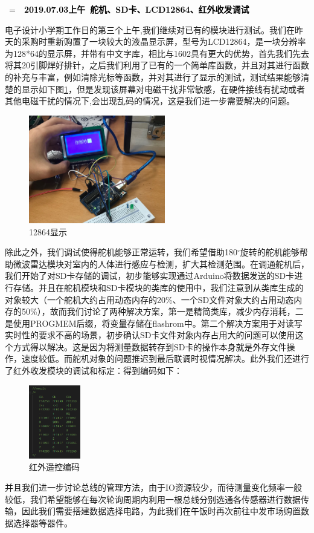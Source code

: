\documentclass[a4paper, 11pt]{article} %
\makeatletter
\newlength\sidebar
\newlength\envborder
\def\esefcolorbox#1#{\esecolor@fbox{#1}}
\def\esecolor@fbox#1#2#3{%
   \color@b@x{\fboxsep\z@\color#1{#2}\fboxs}{\color#1{#3}}}
\newenvironment{eseframed}{%
   \def\FrameCommand{\fboxrule=\the\sidebar  \fboxsep=\the\envborder%
   \esefcolorbox{exampleborder}{examplebg}}%
   \MakeFramed{\FrameRestore}}%
  {\endMakeFramed}
\newcounter{diary}
\newenvironment{diary}[2]
 {\par\medskip\refstepcounter{diary}%
 \hbox{%
 \fboxsep=\the\sidebar\hspace{-\envborder}\hspace{-0.5\sidebar}%
 \colorbox{exampleborder}{%
 \hspace{\envborder}\footnotesize\sffamily\bfseries%
 \textcolor{black}{{#1}\ {#2}\enspace\hspace{\envborder}}
 }
 }
 \nointerlineskip\vspace{-\topsep}%
 \begin{eseframed}\noindent\ignorespaces%
 }
 {\end{eseframed}\vspace{-\baselineskip}\medskip}
\makeatother
\begin{document}
\begin{diary}{2019.07.03上午}{舵机、SD卡、LCD12864、红外收发调试}
  
电子设计小学期工作日的第三个上午,我们继续对已有的模块进行测试。我们在昨天的采购时重新购置了一块较大的液晶显示屏，型号为LCD12864，是一块分辨率为128*64的显示屏，并带有中文字库，相比与1602具有更大的优势，首先我们先去将其20引脚焊好排针，之后我们利用了已有的一个简单库函数，并且对其进行函数的补充与丰富，例如清除光标等函数，并对其进行了显示的测试，测试结果能够清楚的显示如下图\ref{img2}，但是发现该屏幕对电磁干扰非常敏感，在硬件接线有扰动或者其他电磁干扰的情况下,会出现乱码的情况，这是我们进一步需要解决的问题。
\begin{figure}[H]
  \centering
  \includegraphics[width = 0.53\textwidth]{12864.jpg}
  \caption{12864显示}
  \label{img2}
\end{figure}

除此之外，我们调试使得舵机能够正常运转，我们希望借助180$^{\circ}$旋转的舵机能够帮助微波雷达模块对室内的人体进行感应与检测，扩大其检测范围。在调通舵机后，我们开始了对SD卡存储的调试，初步能够实现通过Arduino将数据发送的SD卡进行存储。并且在舵机模块和SD卡模块的类库的使用中，我们注意到从类库生成的对象较大（一个舵机大约占用动态内存的20\%、一个SD文件对象大约占用动态内存的50\%），故而我们讨论了两种解决方案，第一是精简类库，减少内存消耗，二是使用PROGMEM后缀，将变量存储在flashrom中。第二个解决方案用于对读写实时性的要求不高的场景，初步确认SD卡文件对象内存占用大的问题可以使用这个方式得以解决。这是因为将测量数据转存到SD卡的操作本身就是外存文件操作，速度较低。而舵机对象的问题推迟到最后联调时视情况解决。此外我们还进行了红外收发模块的调试和标定：得到编码如下：

\begin{figure}[H]
  \centering
  \includegraphics[width = 0.2\textwidth]{controller_code.png}
  \caption{红外遥控编码}
\end{figure}

并且我们进一步讨论总线的管理方法，由于IO资源较少，而待测量变化频率一般较低，我们希望能够在每次轮询周期内利用一根总线分别选通各传感器进行数据传输，因此我们需要搭建数据选择电路，为此我们在午饭时再次前往中发市场购置数据选择器等器件。

\end{diary}
\end{document}
